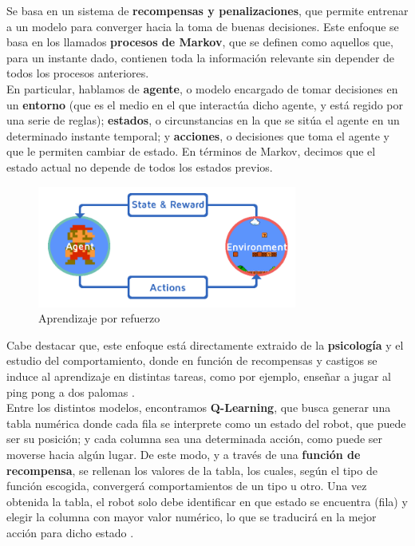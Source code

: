 Se basa en un sistema de \textbf{recompensas y penalizaciones}, que permite entrenar a un modelo para converger hacia la toma de buenas decisiones. Este enfoque se basa en los llamados \textbf{procesos de Markov}, que se definen como aquellos que, para un instante dado, contienen toda la información relevante sin depender de todos los procesos anteriores. \cite{learn}\\

En particular, hablamos de \textbf{agente}, o modelo encargado de tomar decisiones en un \textbf{entorno} (que es el medio en el que interactúa dicho agente, y está regido por una serie de reglas); \textbf{estados}, o circunstancias en la que se sitúa el agente en un determinado instante temporal; y \textbf{acciones}, o decisiones que toma el agente y que le permiten cambiar de estado. En términos de Markov, decimos que el estado actual no depende de todos los estados previos. \cite{props-learn}\\

\begin{figure} [H]
	\begin{center}
	\includegraphics[height=4cm]{imagenes/cap1/9_reinforcement.png}
	\end{center}
	\caption[Aprendizaje por refuerzo]{Aprendizaje por refuerzo}
	\label{fig:reinforcement_learning}
\end{figure}

Cabe destacar que, este enfoque está directamente extraido de la \textbf{psicología} y el estudio del comportamiento, donde en función de recompensas y castigos se induce al aprendizaje en distintas tareas, como por ejemplo, enseñar a jugar al ping pong a dos palomas \cite{psicologia-aprendizaje} \cite{skinner}.\\

Entre los distintos modelos, encontramos \textbf{Q-Learning}, que busca generar una tabla numérica donde cada fila se interprete como un estado del robot, que puede ser su posición; y cada columna sea una determinada acción, como puede ser moverse hacia algún lugar. De este modo, y a través de una \textbf{función de recompensa}, se rellenan los valores de la tabla, los cuales, según el tipo de función escogida, convergerá comportamientos de un tipo u otro. Una vez obtenida la tabla, el robot solo debe identificar en que estado se encuentra (fila) y elegir la columna con mayor valor numérico, lo que se traducirá en la mejor acción para dicho estado \cite{q-learning}.\\

